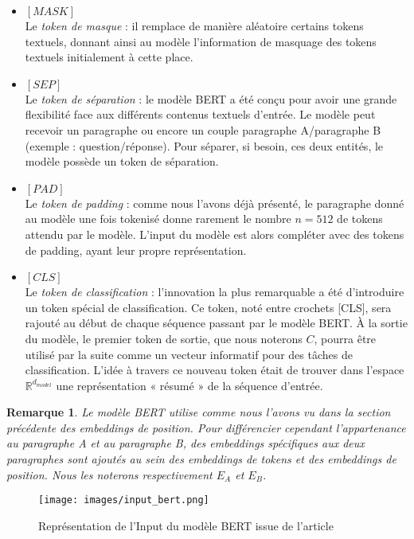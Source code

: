 \documentclass[12pt]{article}
\newtheorem{rmq}{Remarque}
\theoremstyle{definition}
\begin{document}
\begin{itemize}[$ $]
	\item  $[MASK]$ \\
	
	Le \textit{token de masque} : il remplace de manière aléatoire certains tokens textuels, donnant ainsi au modèle l’information de masquage des tokens textuels initialement à cette place.\\
	
	\item  $[SEP]$\\
	
	Le \textit{token de séparation} : le modèle BERT a été conçu pour avoir une grande flexibilité face aux différents contenus textuels d’entrée. Le modèle peut recevoir un paragraphe ou encore un couple paragraphe A/paragraphe B (exemple : question/réponse). Pour séparer, si besoin, ces deux entités, le modèle possède un token de séparation.\\
	
	\item  $[PAD]$\\
	
	Le \textit{token de padding} : comme nous l’avons déjà présenté, le paragraphe donné au modèle une fois tokenisé donne rarement le nombre $n=512$ de tokens attendu par le modèle. L’input du modèle est alors compléter avec des tokens de padding, ayant leur propre représentation.\\
	
	\item  $[CLS]$\\
	
	Le \textit{token de classification} : l'innovation la plus remarquable a été d'introduire un token spécial de classification. Ce token, noté entre crochets [CLS], sera rajouté au début de chaque séquence passant par le modèle BERT. À la sortie du modèle, le premier token de sortie, que nous noterons $C$, pourra être utilisé par la suite comme un vecteur informatif pour des tâches de classification. L’idée à travers ce nouveau token était de trouver dans l’espace $\mathbb{R}^{d_{model}}$ une représentation « résumé » de la séquence d’entrée.\\	
\end{itemize}

\begin{rmq}
	Le modèle BERT utilise comme nous l’avons vu dans la section précédente des embeddings de position. Pour différencier cependant l’appartenance au paragraphe A et au paragraphe B, des embeddings spécifiques aux deux paragraphes sont ajoutés au sein des embeddings de tokens et des embeddings de position. Nous les noterons respectivement $E_A$ et  $E_B$.
	
\end{rmq}
 \newpage
 \begin{figure*}[!h]
 	\centering
 	\texttt{[image: images/input\_bert.png]}
 	\caption{Représentation de l'Input du modèle BERT issue de l'article \cite{bert_paper}}
 \end{figure*}
\end{document}
